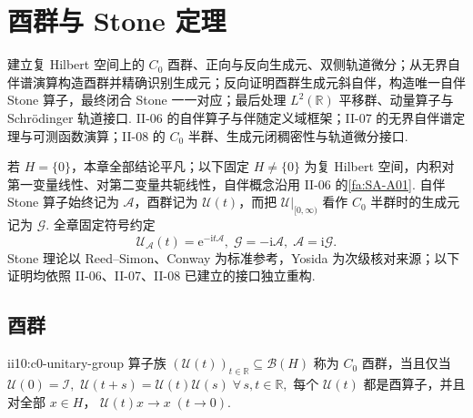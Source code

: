 \chapter{酉群与 Stone 定理}\label{chap:II-10}
\FAChapterOpening
{建立复 Hilbert 空间上的 \(\displaystyle C_0\) 酉群、正向与反向生成元、双侧轨道微分；从无界自伴谱演算构造酉群并精确识别生成元；反向证明酉群生成元斜自伴，构造唯一自伴 Stone 算子，最终闭合 Stone 一一对应；最后处理 \(\displaystyle L^2(\mathbb R)\) 平移群、动量算子与 Schrödinger 轨道接口.}
{II-06 的自伴算子与伴随定义域框架；II-07 的无界自伴谱定理与可测函数演算；II-08 的 \(\displaystyle C_0\) 半群、生成元闭稠密性与轨道微分接口.}
{\begin{center}
\end{center}}

若 \(\displaystyle H=\{0\}\)，本章全部结论平凡；以下固定 \(\displaystyle H\neq\{0\}\) 为复 Hilbert 空间，内积对第一变量线性、对第二变量共轭线性，自伴概念沿用 II-06 的\autoref{fa:SA-A01}. 自伴 Stone 算子始终记为 \(\displaystyle\mathcal A\)，酉群记为 \(\displaystyle\mathcal U(t)\)，而把 \(\displaystyle\mathcal U|_{[0,\infty)}\) 看作 \(\displaystyle C_0\) 半群时的生成元记为 \(\displaystyle\mathcal G\). 全章固定符号约定
\[
\mathcal U_{\mathcal A}(t)
=
\mathrm{e}^{-\mathrm{i}t\mathcal A},
\;
\mathcal G=-\mathrm{i}\mathcal A,
\;
\mathcal A=\mathrm{i}\mathcal G.
\]
Stone 理论以 Reed--Simon、Conway 为标准参考，Yosida 为次级核对来源；以下证明均依照 II-06、II-07、II-08 已建立的接口独立重构\cite{reed-simon1980,conway1990,yosida}.

\newpage
\section{酉群}\label{sec:ii10-unitary-groups}

\begin{FADefinition}[A][\(\displaystyle C_0\) 酉群]{ii10:c0-unitary-group}
算子族 \(\displaystyle (\mathcal U(t))_{t\in\mathbb R}\subseteq\mathcal B(H)\)
称为 \(\displaystyle C_0\) 酉群，当且仅当 \(\displaystyle \mathcal U(0)=\mathcal I,\) \(\displaystyle \mathcal U(t+s)=\mathcal U(t)\mathcal U(s) \; \forall\,s,t\in\mathbb R,\)
每个 \(\displaystyle\mathcal U(t)\) 都是酉算子，并且对全部 \(\displaystyle x\in H\)， \(\displaystyle \mathcal U(t)x\longrightarrow x \;(t\to0).\)
\end{FADefinition}

